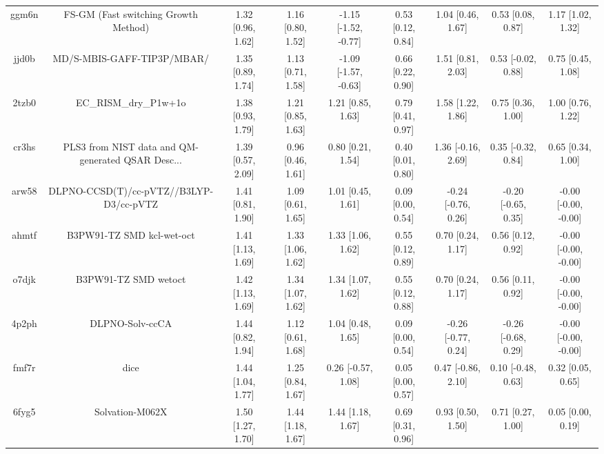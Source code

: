 \documentclass{article}
\begin{document}
\begin{center}
\begin{longtable}{|ccccccccc|}
 ggm6n &               FS-GM (Fast switching Growth Method) &  1.32 [0.96, 1.62] &  1.16 [0.80, 1.52] &  -1.15 [-1.52, -0.77] &  0.53 [0.12, 0.84] &    1.04 [0.46, 1.67] &    0.53 [0.08, 0.87] &     1.17 [1.02, 1.32] \\
 jjd0b &                         MD/S-MBIS-GAFF-TIP3P/MBAR/ &  1.35 [0.89, 1.74] &  1.13 [0.71, 1.58] &  -1.09 [-1.57, -0.63] &  0.66 [0.22, 0.90] &    1.51 [0.81, 2.03] &   0.53 [-0.02, 0.88] &     0.75 [0.45, 1.08] \\
 2tzb0 &                              EC\_RISM\_dry\_P1w+1o &  1.38 [0.93, 1.79] &  1.21 [0.85, 1.63] &     1.21 [0.85, 1.63] &  0.79 [0.41, 0.97] &    1.58 [1.22, 1.86] &    0.75 [0.36, 1.00] &     1.00 [0.76, 1.22] \\
 cr3hs &  PLS3 from NIST data and QM-generated QSAR Desc... &  1.39 [0.57, 2.09] &  0.96 [0.46, 1.61] &     0.80 [0.21, 1.54] &  0.40 [0.01, 0.80] &   1.36 [-0.16, 2.69] &   0.35 [-0.32, 0.84] &     0.65 [0.34, 1.00] \\
 arw58 &            DLPNO-CCSD(T)/cc-pVTZ//B3LYP-D3/cc-pVTZ &  1.41 [0.81, 1.90] &  1.09 [0.61, 1.65] &     1.01 [0.45, 1.61] &  0.09 [0.00, 0.54] &  -0.24 [-0.76, 0.26] &  -0.20 [-0.65, 0.35] &  -0.00 [-0.00, -0.00] \\
 ahmtf &                          B3PW91-TZ SMD kcl-wet-oct &  1.41 [1.13, 1.69] &  1.33 [1.06, 1.62] &     1.33 [1.06, 1.62] &  0.55 [0.12, 0.89] &    0.70 [0.24, 1.17] &    0.56 [0.12, 0.92] &  -0.00 [-0.00, -0.00] \\
 o7djk &                               B3PW91-TZ SMD wetoct &  1.42 [1.13, 1.69] &  1.34 [1.07, 1.62] &     1.34 [1.07, 1.62] &  0.55 [0.12, 0.88] &    0.70 [0.24, 1.17] &    0.56 [0.11, 0.92] &  -0.00 [-0.00, -0.00] \\
 4p2ph &                                    DLPNO-Solv-ccCA &  1.44 [0.82, 1.94] &  1.12 [0.61, 1.68] &     1.04 [0.48, 1.65] &  0.09 [0.00, 0.54] &  -0.26 [-0.77, 0.24] &  -0.26 [-0.68, 0.29] &  -0.00 [-0.00, -0.00] \\
 fmf7r &                                               dice &  1.44 [1.04, 1.77] &  1.25 [0.84, 1.67] &    0.26 [-0.57, 1.08] &  0.05 [0.00, 0.57] &   0.47 [-0.86, 2.10] &   0.10 [-0.48, 0.63] &     0.32 [0.05, 0.65] \\
 6fyg5 &                                    Solvation-M062X &  1.50 [1.27, 1.70] &  1.44 [1.18, 1.67] &     1.44 [1.18, 1.67] &  0.69 [0.31, 0.96] &    0.93 [0.50, 1.50] &    0.71 [0.27, 1.00] &     0.05 [0.00, 0.19] \\

\end{longtable}
\end{center}
\end{document}
